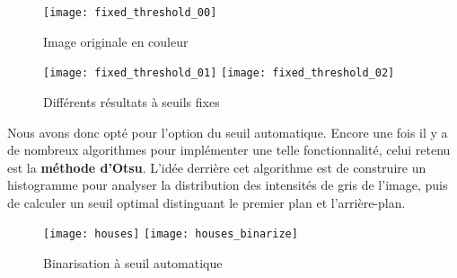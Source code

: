\begin{figure}[H]
    \centering
    \texttt{[image: fixed\_threshold\_00]}
    \caption{Image originale en couleur}
\end{figure}

\begin{figure}[H]
    \centering
    \texttt{[image: fixed\_threshold\_01]}
    \texttt{[image: fixed\_threshold\_02]}
    \caption{Différents résultats à seuils fixes}
\end{figure}

\newpage

Nous avons donc opté pour l'option du seuil automatique. Encore une fois il y a
de nombreux algorithmes pour implémenter une telle fonctionnalité, celui retenu
est la \textbf{méthode d'Otsu}. L'idée derrière cet algorithme est de construire
un histogramme pour analyser la distribution des intensités de gris de l'image,
puis de calculer un seuil optimal distinguant le premier plan et l'arrière-plan.

\begin{figure}[H]
    \centering
    \texttt{[image: houses]}
    \texttt{[image: houses\_binarize]}
    \caption{Binarisation à seuil automatique}
\end{figure}
